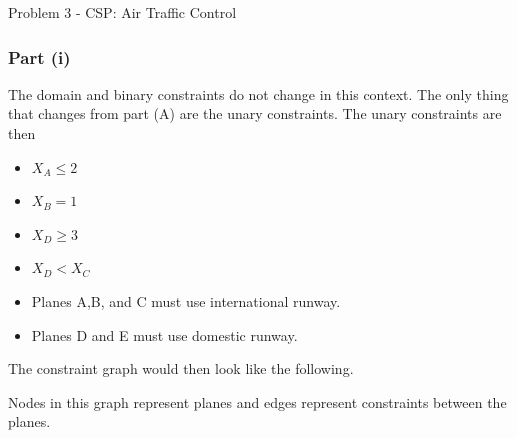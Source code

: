 \begin{problem}{Problem 3 - CSP: Air Traffic Control}
    \begin{highlight}
        \subsubsection*{Part (i)}

        The domain and binary constraints do not change in this context. The only thing that changes from part (A) are the unary constraints. The unary constraints are then \vspace*{1em}

        \begin{center}
            \begin{highlightenv}[10cm]
                \begin{itemize}
                    \item $X_{A} \leq 2$
                    \item $X_{B} = 1$
                    \item $X_{D} \geq 3$
                    \item $X_{D} < X_{C}$
                    \item Planes A,B, and C must use international runway.
                    \item Planes D and E must use domestic runway.
                \end{itemize}
            \end{highlightenv}
        \end{center}

        The constraint graph would then look like the following.

        \begin{center}
        \end{center}
        Nodes in this graph represent planes and edges represent constraints between the planes.


\end{highlight}
\end{problem}
